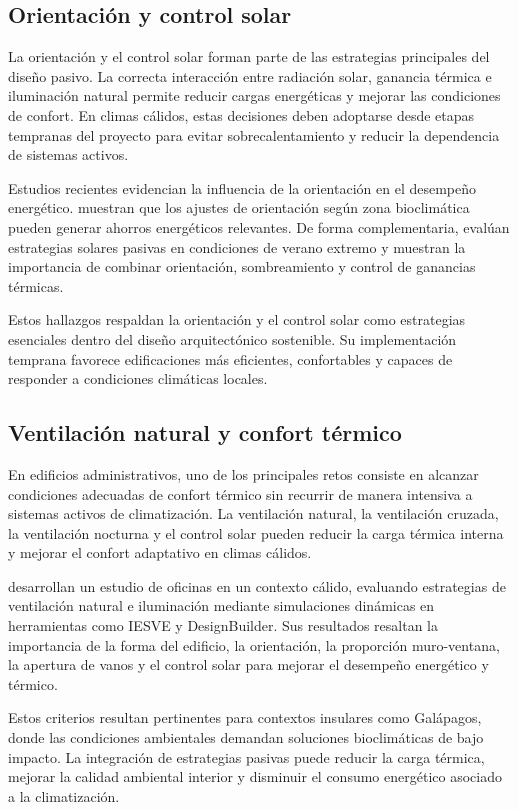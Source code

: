 \begin{textoDosTercios}

\subsection{Orientación y control solar}

La orientación y el control solar forman parte de las estrategias principales del diseño pasivo. La correcta interacción entre radiación solar, ganancia térmica e iluminación natural permite reducir cargas energéticas y mejorar las condiciones de confort. En climas cálidos, estas decisiones deben adoptarse desde etapas tempranas del proyecto para evitar sobrecalentamiento y reducir la dependencia de sistemas activos.

Estudios recientes evidencian la influencia de la orientación en el desempeño energético. \textcite{karimiImpactBuildingOrientation2024} muestran que los ajustes de orientación según zona bioclimática pueden generar ahorros energéticos relevantes. De forma complementaria, \textcite{nogueiraEnergeticAnalysisPassive2024} evalúan estrategias solares pasivas en condiciones de verano extremo y muestran la importancia de combinar orientación, sombreamiento y control de ganancias térmicas.

Estos hallazgos respaldan la orientación y el control solar como estrategias esenciales dentro del diseño arquitectónico sostenible. Su implementación temprana favorece edificaciones más eficientes, confortables y capaces de responder a condiciones climáticas locales.

\subsection{Ventilación natural y confort térmico}

En edificios administrativos, uno de los principales retos consiste en alcanzar condiciones adecuadas de confort térmico sin recurrir de manera intensiva a sistemas activos de climatización. La ventilación natural, la ventilación cruzada, la ventilación nocturna y el control solar pueden reducir la carga térmica interna y mejorar el confort adaptativo en climas cálidos.

\textcite{zoureImplementingNaturalVentilation2023a} desarrollan un estudio de oficinas en un contexto cálido, evaluando estrategias de ventilación natural e iluminación mediante simulaciones dinámicas en herramientas como IESVE y DesignBuilder. Sus resultados resaltan la importancia de la forma del edificio, la orientación, la proporción muro-ventana, la apertura de vanos y el control solar para mejorar el desempeño energético y térmico.

Estos criterios resultan pertinentes para contextos insulares como Galápagos, donde las condiciones ambientales demandan soluciones bioclimáticas de bajo impacto. La integración de estrategias pasivas puede reducir la carga térmica, mejorar la calidad ambiental interior y disminuir el consumo energético asociado a la climatización.

\end{textoDosTercios}


